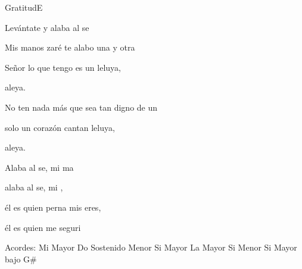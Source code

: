\documentclass[12pt, spanish]{book}
\begin{document}
\begin{song}{Gratitud}{E}
\begin{SBOpGroup}
            Levántate y alaba al se 
        \end{SBOpGroup}


        \begin{SBChorus}
            Mis manos zaré te alabo una y otra 

            Señor lo que tengo es un leluya,

            aleya.

            No ten nada más que sea tan digno de un 

            solo un corazón cantan leluya,

            aleya.
        \end{SBChorus}

        \begin{SBOpGroup}
            Alaba al se, mi ma

            alaba al se, mi ,

            él es quien perna mis eres,

            él es quien me  seguri
        \end{SBOpGroup}

        \ifChordBk
        \begin{SBOpGroup}
            Acordes:\break
            \upchord{\E}\qquad Mi Mayor \hfill
            \upchord{\Csm}\qquad Do Sostenido Menor \hfill\null\break
            \upchord{\B}\qquad\qquad Si Mayor \hfill
            \upchord{\A}\qquad La Mayor \hfill\null\break
            \upchord{\Bm}\qquad Si Menor \hfill\null\break
            \upchord{\BGs}\qquad\qquad Si Mayor bajo G\# \hfill\null\break
        \end{SBOpGroup}
        \fi
    \end{song}
\end{document}
